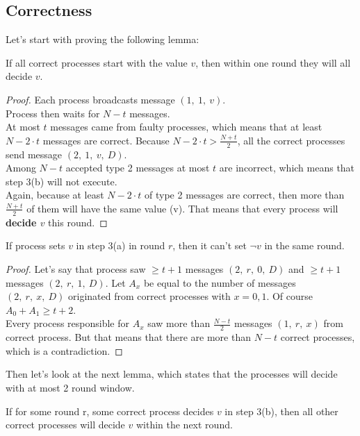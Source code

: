 \documentclass[12pt, a4paper]{article}
\begin{document}
\subsection*{Correctness}
Let's start with proving the following lemma:
\begin{lemma}\label{same-value}
If all correct processes start with the value $v$, then within one round they will all decide $v$.
\end{lemma}
\begin{proof}
Each process broadcasts message $(1,\ 1,\ v)$.\\
Process then waits for $N-t$ messages.\\
At most $t$ messages came from faulty processes, which means that at least $N-2\cdot t$ messages are correct. Because $N-2\cdot t>\frac{N+t}{2}$, all the correct processes send message $(2,\ 1,\ v,\ D)$.\\
Among $N-t$ accepted type 2 messages at most $t$ are incorrect, which means that step 3(b) will not execute.\\
Again, because at least $N-2\cdot t$ of type 2 messages are correct, then more than $\frac{N+t}{2}$ of them will have the same value (v). That means that every process will \textbf{decide $v$} this round.
\end{proof}
\begin{lemma}\label{one-choice}
If process sets $v$ in step 3(a) in round $r$, then it can't set $\neg v$ in the same round.
\end{lemma}
\begin{proof}
Let's say that process saw $\geq t+1$ messages  $(2,\ r,\ 0,\ D)$ and $\geq t+1$ messages $(2,\ r,\ 1,\ D)$. Let $A_x$ be equal to the number of messages $(2,\ r,\ x,\ D)$ originated from correct processes with $x=0,1$. Of course $A_0+A_1\geq t+2$.\\
Every process responsible for $A_x$ saw more than $\frac{N-t}{2}$ messages $(1,\ r,\ x)$ from correct process. But that means that there are more than $N-t$ correct processes, which is a contradiction.
\end{proof}
Then let's look at the next lemma, which states that the processes will decide with at most 2 round window.
\begin{lemma}
If for some round r, some correct process decides $v$ in step 3(b), then all other correct processes will decide $v$ within the next round.
\end{lemma}
\end{document}
